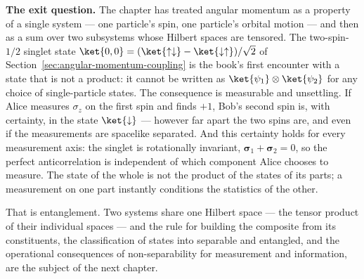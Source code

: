 \medskip\noindent\textbf{The exit question.} The chapter has treated angular momentum as a property of a single system --- one particle's spin, one particle's orbital motion --- and then as a sum over two subsystems whose Hilbert spaces are tensored. The two-spin-$1/2$ singlet state $\ket{0,0} = (\ket{\uparrow\downarrow} - \ket{\downarrow\uparrow})/\sqrt{2}$ of Section~\ref{sec:angular-momentum-coupling} is the book's first encounter with a state that is not a product: it cannot be written as $\ket{\psi_1}\otimes\ket{\psi_2}$ for any choice of single-particle states. The consequence is measurable and unsettling. If Alice measures $\sigma_z$ on the first spin and finds $+1$, Bob's second spin is, with certainty, in the state $\ket{\downarrow}$ --- however far apart the two spins are, and even if the measurements are spacelike separated. And this certainty holds for every measurement axis: the singlet is rotationally invariant, $\bm\sigma_1 + \bm\sigma_2 = 0$, so the perfect anticorrelation is independent of which component Alice chooses to measure. The state of the whole is not the product of the states of its parts; a measurement on one part instantly conditions the statistics of the other.

That is entanglement. Two systems share one Hilbert space --- the tensor product of their individual spaces --- and the rule for building the composite from its constituents, the classification of states into separable and entangled, and the operational consequences of non-separability for measurement and information, are the subject of the next chapter.

